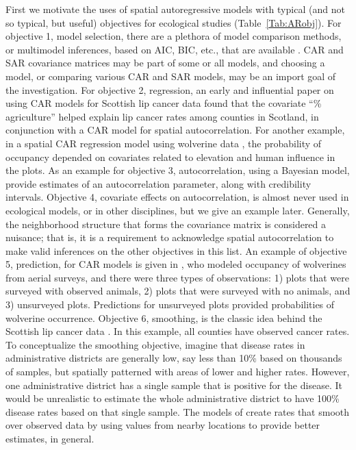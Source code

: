 \documentclass[11pt, titlepage]{article}\usepackage[]{graphicx}\usepackage[]{color}
\begin{document}
First we motivate the uses of spatial autoregressive models with typical (and not so typical, but useful) objectives for ecological studies (Table~\ref{Tab:ARobj}).  For objective 1, model selection, there are a plethora of model comparison methods, or multimodel inferences, based on AIC, BIC, etc., that are available \citep[see, e.g.,][]{Burn:Ande:mode:2002}.  CAR and SAR covariance matrices may be part of some or all models, and choosing a model, or comparing various CAR and SAR models, may be an import goal of the investigation.  For objective 2, regression, an early and influential paper on using CAR models for Scottish lip cancer data \citep{Clay:Kald:empi:1987} found that the covariate ``\% agriculture'' helped explain lip cancer rates among counties in Scotland, in conjunction with a CAR model for spatial autocorrelation.  For another example, in a spatial CAR regression model using wolverine data \citep{Gard:Lawl:Ver:Mago:Kell:coar:2010}, the probability of occupancy depended on covariates related to elevation and human influence in the plots. As an example for objective 3, autocorrelation, using a Bayesian model, \citet{Gard:Lawl:Ver:Mago:Kell:coar:2010} provide estimates of an autocorrelation parameter, along with credibility intervals. Objective 4, covariate effects on autocorrelation, is almost never used in ecological models, or in other disciplines, but we give an example later. Generally, the neighborhood structure that forms the covariance matrix is considered a nuisance; that is, it is a requirement to acknowledge spatial autocorrelation to make valid inferences on the other objectives in this list. An example of objective 5, prediction, for CAR models is given in \citet{Gard:Lawl:Ver:Mago:Kell:coar:2010}, who modeled occupancy of wolverines from aerial surveys, and there were three types of observations: 1) plots that were surveyed with observed animals, 2) plots that were surveyed with no animals, and 3) unsurveyed plots.  Predictions for unsurveyed plots provided probabilities of wolverine occurrence. Objective 6, smoothing, is the classic idea behind the Scottish lip cancer data \citep{Clay:Kald:empi:1987}.  In this example, all counties have observed cancer rates. To conceptualize the smoothing objective, imagine that disease rates in administrative districts are generally low, say less than 10\% based on thousands of samples, but spatially patterned with areas of lower and higher rates.  However, one administrative district has a single sample that is positive for the disease.  It would be unrealistic to estimate the whole administrative district to have 100\% disease rates based on that single sample.  The models of \citet{Clay:Kald:empi:1987} create rates that smooth over observed data by using values from nearby locations to provide better estimates, in general.
\end{document}
